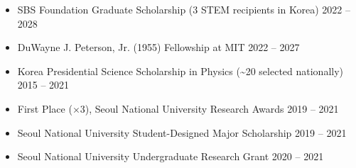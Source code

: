 \documentclass[11pt,a4paper,roman]{moderncv}        %
\begin{document}

    \small{
        \begin{itemize}
        \item[--] SBS Foundation Graduate Scholarship (3 STEM recipients in Korea) \hfill 2022 – 2028
	  \item[--] DuWayne J. Peterson, Jr. (1955) Fellowship at MIT  \hfill 2022 – 2027
        \item[--] Korea Presidential Science Scholarship in Physics (\textasciitilde20 selected nationally) \hfill 2015 – 2021
        \item[--] First Place ($\times$3), Seoul National University Research Awards \hfill 2019 – 2021
        \item[--] Seoul National University Student-Designed Major Scholarship \hfill 2019 – 2021
        \item[--] Seoul National University Undergraduate Research Grant \hfill 2020 – 2021
    	\end{itemize}
    	}
\end{document}
